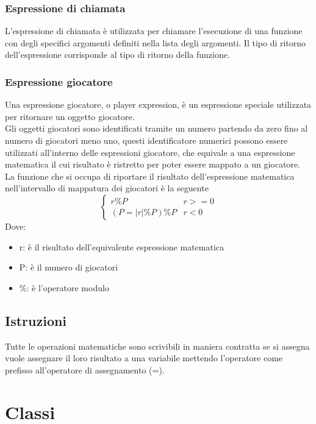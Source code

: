 \subsubsection{Espressione di chiamata}
L'espressione di chiamata è utilizzata per chiamare l'esecuzione di una funzione 
con degli specifici argomenti definiti nella lista degli argomenti.
Il tipo di ritorno dell'espressione corrisponde al tipo di ritorno della funzione.

\subsubsection{Espressione giocatore}
Una espressione giocatore, o player expression, è un espressione speciale utilizzata per ritornare 
un oggetto giocatore. 
\\
Gli oggetti giocatori sono identificati tramite un numero partendo da zero fino al numero di giocatori meno uno,
questi identificatore numerici possono essere utilizzati all'interno delle espressioni giocatore, che equivale 
a una espressione matematica il cui risultato è ristretto per poter essere mappato a un giocatore.
\\
La funzione che si occupa di riportare il risultato dell'espressione matematica nell'intervallo di 
mappatura dei giocatori è la seguente
\[
\begin{cases}
    r \% P  & r >= 0 \\
    (P = |r| \% P) \% P & r < 0
\end{cases}
\] 
Dove:
\begin{itemize}
    \item r: è il risultato dell'equivalente espressione matematica
    \item P: è il numero di giocatori
    \item \%: è l'operatore modulo
\end{itemize}


\newpage
\subsection{Istruzioni}
Tutte le operazioni matematiche sono scrivibili in maniera contratta se si assegna 
vuole assegnare il loro risultato a una variabile mettendo l’operatore come 
prefisso all’operatore di assegnamento (=).
\newpage
 
\section{Classi}


